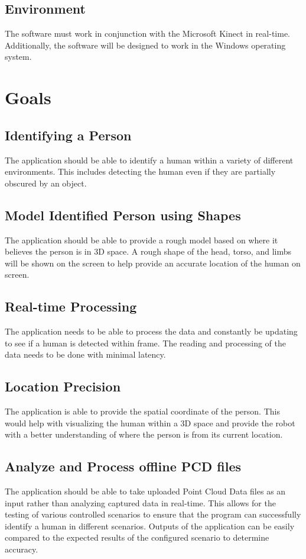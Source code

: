 \documentclass{article}
\begin{document}
\subsection{Environment}
The software must work in conjunction with the Microsoft Kinect in real-time. Additionally, the software will be designed to work in the Windows operating system.

\newpage
\section{Goals}   

\subsection{Identifying a Person}
The application should be able to identify a human within a variety of different environments. This includes detecting the human even if they are partially obscured by an object.

\subsection{Model Identified Person using Shapes}
The application should be able to provide a rough model based on where it believes the person is in 3D space. A rough shape of the head, torso, and limbs will be shown on the screen to help provide an accurate location of the human on screen.

\subsection{Real-time Processing}
The application needs to be able to process the data and constantly be updating to see if a human is detected within frame. The reading and processing of the data needs to be done with minimal latency.

\subsection{Location Precision}
The application is able to provide the spatial coordinate of the person. This would help with visualizing the human within a 3D space and provide the robot with a better understanding of where the person is from its current location.

\subsection{Analyze and Process offline PCD files}
The application should be able to take uploaded Point Cloud Data files as an input rather than analyzing captured data in real-time. This allows for the testing of various controlled scenarios to ensure that the program can successfully identify a human in different scenarios. Outputs of the application can be easily compared to the expected results of the configured scenario to determine accuracy.
        
\end{document}

